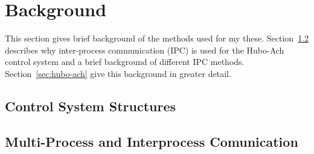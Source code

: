 \chapter{Background}\label{sec:background}

This section gives brief background of the methods used for my these.
Section~\ref{sec:back:hubo-ach} describes why inter-process communication (IPC) is used for the Hubo-Ach control system and a brief background of different IPC methods.
Section~\ref{sec:hubo-ach} give this background in greater detail.

		\section{Control System Structures}\label{sec:back:struct}
				
		\section{Multi-Process and Interprocess Comunication}\label{sec:back:hubo-ach}
	    		
